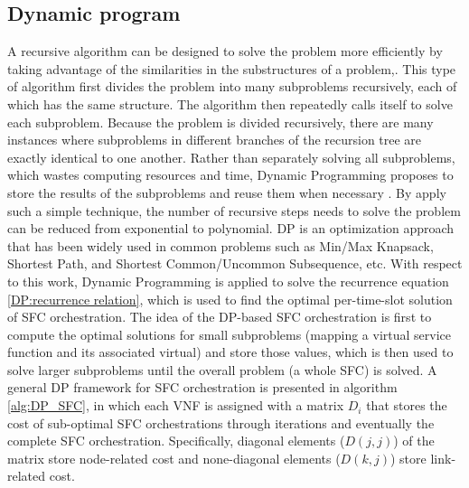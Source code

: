 \subsection{Dynamic program}
A recursive algorithm can be designed to solve the problem more efficiently by taking advantage of the similarities in the substructures of a
problem,\cite{IntroductiontoAlgorithm}.
This type of algorithm first divides the problem into many subproblems recursively, each of which has the same structure. The algorithm then repeatedly calls itself to solve each subproblem. Because the problem is divided recursively, there are many instances where subproblems in different branches of the recursion tree are exactly identical to one another.
Rather than separately solving all subproblems,
which wastes computing resources and time, Dynamic Programming proposes to store the results of the subproblems and reuse them when necessary \cite{IntroductiontoAlgorithm}. By apply such a simple technique,
the number of recursive steps needs to solve the problem can be reduced from exponential to polynomial. DP is an optimization approach that has been widely used in common problems such as Min/Max
Knapsack, Shortest Path, and Shortest Common/Uncommon Subsequence, etc. With respect to this work, Dynamic Programming is applied to solve the recurrence equation \ref{DP:recurrence relation}, which is used to find the optimal per-time-slot solution of SFC orchestration.
The idea of the DP-based SFC orchestration is first to compute the optimal solutions for small subproblems (mapping a virtual service function and its associated virtual) and store those values, which is then used to solve larger subproblems until the overall problem (a whole SFC) is solved.
A general DP framework for SFC orchestration is presented in algorithm \ref{alg:DP_SFC}, in which each VNF is assigned with a matrix $D_i$ that stores the cost of sub-optimal SFC orchestrations through iterations and eventually the complete SFC orchestration. Specifically, diagonal elements ($D(j,j)$) of the matrix store node-related cost and none-diagonal elements ($D(k,j)$) store link-related cost. 

